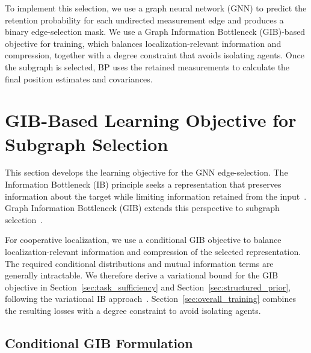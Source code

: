 {\color{blue}

To implement this selection, we use a graph neural network (GNN) to predict the retention probability for each undirected measurement edge and produces a binary edge-selection mask. We use a Graph Information Bottleneck (GIB)-based objective for training, which balances localization-relevant information and compression, together with a degree constraint that avoids isolating agents. Once the subgraph is selected, BP uses the retained measurements to calculate the final position estimates and covariances.

}


\section{GIB-Based Learning Objective for Subgraph Selection}
\label{sec:gib_framework}
This section develops the learning objective for the GNN edge-selection. The Information Bottleneck (IB) principle seeks a representation that preserves information about the target while limiting information retained from the input~\cite{Tishby2000IB}. Graph Information Bottleneck (GIB) extends this perspective to subgraph selection~\cite{Yu2021GIB}.

For cooperative localization, we use a conditional GIB objective to balance localization-relevant information and compression of the selected representation. The required conditional distributions and mutual information terms are generally intractable. We therefore derive a variational bound for the GIB objective in Section~\ref{sec:task_sufficiency} and Section~\ref{sec:structured_prior}, following the variational IB approach~\cite{Alemi2017VIB}. Section~\ref{sec:overall_training} combines the resulting losses with a degree constraint to avoid isolating agents.

\subsection{Conditional GIB Formulation}
\label{sec:conditional_gib}

